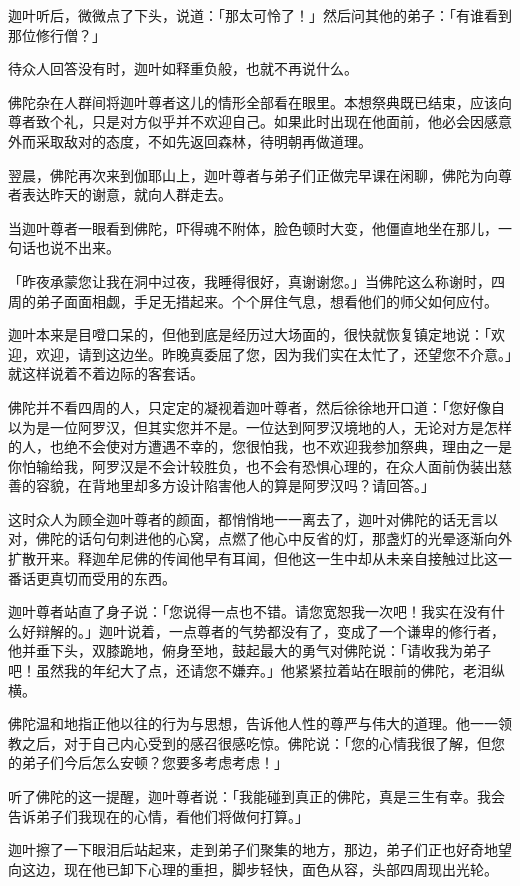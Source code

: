 \documentclass[twoside,openany]{book}
\begin{document}
迦叶听后，微微点了下头，说道：「那太可怜了！」然后问其他的弟子：「有谁看到那位修行僧？」

待众人回答没有时，迦叶如释重负般，也就不再说什么。

佛陀杂在人群间将迦叶尊者这儿的情形全部看在眼里。本想祭典既已结束，应该向尊者致个礼，只是对方似乎并不欢迎自己。如果此时出现在他面前，他必会因感意外而采取敌对的态度，不如先返回森林，待明朝再做道理。

翌晨，佛陀再次来到伽耶山上，迦叶尊者与弟子们正做完早课在闲聊，佛陀为向尊者表达昨天的谢意，就向人群走去。

当迦叶尊者一眼看到佛陀，吓得魂不附体，脸色顿时大变，他僵直地坐在那儿，一句话也说不出来。

「昨夜承蒙您让我在洞中过夜，我睡得很好，真谢谢您。」当佛陀这么称谢时，四周的弟子面面相觑，手足无措起来。个个屏住气息，想看他们的师父如何应付。

迦叶本来是目噔口呆的，但他到底是经历过大场面的，很快就恢复镇定地说：「欢迎，欢迎，请到这边坐。昨晚真委屈了您，因为我们实在太忙了，还望您不介意。」就这样说着不着边际的客套话。

佛陀并不看四周的人，只定定的凝视着迦叶尊者，然后徐徐地开口道：「您好像自以为是一位阿罗汉，但其实您并不是。一位达到阿罗汉境地的人，无论对方是怎样的人，也绝不会使对方遭遇不幸的，您很怕我，也不欢迎我参加祭典，理由之一是你怕输给我，阿罗汉是不会计较胜负，也不会有恐惧心理的，在众人面前伪装出慈善的容貌，在背地里却多方设计陷害他人的算是阿罗汉吗？请回答。」

这时众人为顾全迦叶尊者的颜面，都悄悄地一一离去了，迦叶对佛陀的话无言以对，佛陀的话句句刺进他的心窝，点燃了他心中反省的灯，那盏灯的光晕逐渐向外扩散开来。释迦牟尼佛的传闻他早有耳闻，但他这一生中却从未亲自接触过比这一番话更真切而受用的东西。

迦叶尊者站直了身子说：「您说得一点也不错。请您宽恕我一次吧！我实在没有什么好辩解的。」迦叶说着，一点尊者的气势都没有了，变成了一个谦卑的修行者，他并垂下头，双膝跪地，俯身至地，鼓起最大的勇气对佛陀说：「请收我为弟子吧！虽然我的年纪大了点，还请您不嫌弃。」他紧紧拉着站在眼前的佛陀，老泪纵横。

佛陀温和地指正他以往的行为与思想，告诉他人性的尊严与伟大的道理。他一一领教之后，对于自己内心受到的感召很感吃惊。佛陀说：「您的心情我很了解，但您的弟子们今后怎么安顿？您要多考虑考虑！」

听了佛陀的这一提醒，迦叶尊者说：「我能碰到真正的佛陀，真是三生有幸。我会告诉弟子们我现在的心情，看他们将做何打算。」

迦叶擦了一下眼泪后站起来，走到弟子们聚集的地方，那边，弟子们正也好奇地望向这边，现在他已卸下心理的重担，脚步轻快，面色从容，头部四周现出光轮。
\end{document}
